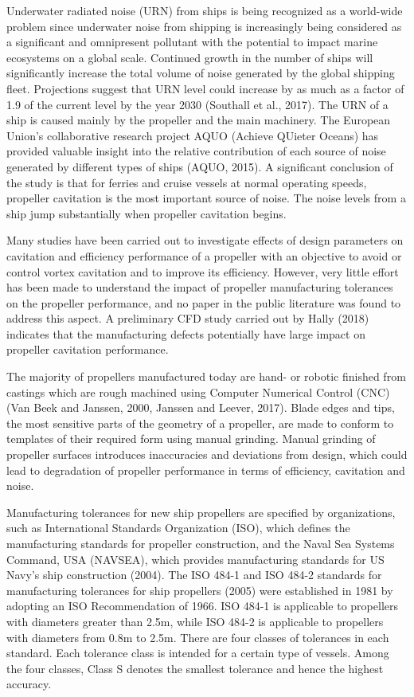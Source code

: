 \documentclass[onecolumn,11pt]{report}
\begin{document}
Underwater radiated noise (URN) from ships is being recognized as a world-wide problem since underwater noise from shipping is increasingly being considered as a significant and omnipresent pollutant with the potential to impact marine ecosystems on a global scale. Continued growth in the number of ships will significantly increase the total volume of noise generated by the global shipping fleet. Projections suggest that URN level could increase by as much as a factor of 1.9 of the current level by the year 2030 (Southall et al., 2017). The URN of a ship is caused mainly by the propeller and the main machinery. The European Union's collaborative research project AQUO (Achieve QUieter Oceans) has provided valuable insight into the relative contribution of each source of noise generated by different types of ships (AQUO, 2015). A significant conclusion of the study is that for ferries and cruise vessels at normal operating speeds, propeller cavitation is the most important source of noise. The noise levels from a ship jump substantially when propeller cavitation begins. 

Many studies have been carried out to investigate effects of design parameters on cavitation and efficiency performance of a propeller with an objective to avoid or control vortex cavitation and to improve its efficiency. However, very little effort has been made to understand the impact of propeller manufacturing tolerances on the propeller performance, and no paper in the public literature was found to address this aspect. A preliminary CFD study carried out by Hally (2018) indicates that the manufacturing defects potentially have large impact on propeller cavitation performance.

The majority of propellers manufactured today are hand- or robotic finished from castings which are rough machined using Computer Numerical Control (CNC) (Van Beek and Janssen, 2000, Janssen and Leever, 2017). Blade edges and tips, the most sensitive parts of the geometry of a propeller,  are made to conform to templates of their required form using manual grinding. Manual grinding of propeller surfaces introduces inaccuracies and deviations from design, which could lead to degradation of propeller performance in terms of efficiency, cavitation and noise. 

Manufacturing tolerances for new ship propellers are specified by organizations, such as International Standards Organization (ISO), which defines the manufacturing standards for propeller construction, and the Naval Sea Systems Command, USA (NAVSEA), which provides manufacturing standards for US Navy's ship construction (2004). The ISO 484-1 and ISO 484-2  standards for manufacturing tolerances for ship propellers (2005) were established in 1981 by adopting an ISO Recommendation of 1966. ISO 484-1 is applicable to propellers with diameters greater than 2.5m, while ISO 484-2 is applicable to propellers with diameters from 0.8m to 2.5m. There are four classes of tolerances in each standard. Each tolerance class is intended for a certain type of vessels. Among the four classes, Class S denotes the smallest tolerance and hence the highest accuracy. 
\end{document}
